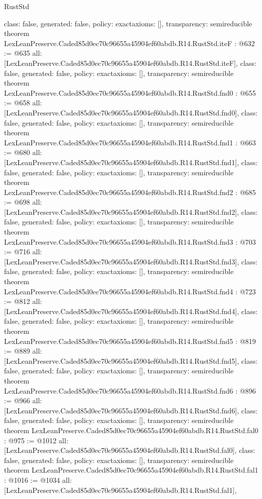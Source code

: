 \begin{lexlean}{RustStd}
\begin{coremodule}
{  class: false,
  generated: false,
  policy: exact{axioms: []},
  transparency: semireducible
}
theorem LexLeanPreserve.Caded85d0ec70c96655a45904ef60abdb.R14.RustStd.iteF : @632 := @635 {
  all: [LexLeanPreserve.Caded85d0ec70c96655a45904ef60abdb.R14.RustStd.iteF],
  class: false,
  generated: false,
  policy: exact{axioms: []},
  transparency: semireducible
}
theorem LexLeanPreserve.Caded85d0ec70c96655a45904ef60abdb.R14.RustStd.fnd0 : @655 := @658 {
  all: [LexLeanPreserve.Caded85d0ec70c96655a45904ef60abdb.R14.RustStd.fnd0],
  class: false,
  generated: false,
  policy: exact{axioms: []},
  transparency: semireducible
}
theorem LexLeanPreserve.Caded85d0ec70c96655a45904ef60abdb.R14.RustStd.fnd1 : @663 := @680 {
  all: [LexLeanPreserve.Caded85d0ec70c96655a45904ef60abdb.R14.RustStd.fnd1],
  class: false,
  generated: false,
  policy: exact{axioms: []},
  transparency: semireducible
}
theorem LexLeanPreserve.Caded85d0ec70c96655a45904ef60abdb.R14.RustStd.fnd2 : @685 := @698 {
  all: [LexLeanPreserve.Caded85d0ec70c96655a45904ef60abdb.R14.RustStd.fnd2],
  class: false,
  generated: false,
  policy: exact{axioms: []},
  transparency: semireducible
}
theorem LexLeanPreserve.Caded85d0ec70c96655a45904ef60abdb.R14.RustStd.fnd3 : @703 := @716 {
  all: [LexLeanPreserve.Caded85d0ec70c96655a45904ef60abdb.R14.RustStd.fnd3],
  class: false,
  generated: false,
  policy: exact{axioms: []},
  transparency: semireducible
}
theorem LexLeanPreserve.Caded85d0ec70c96655a45904ef60abdb.R14.RustStd.fnd4 : @723 := @812 {
  all: [LexLeanPreserve.Caded85d0ec70c96655a45904ef60abdb.R14.RustStd.fnd4],
  class: false,
  generated: false,
  policy: exact{axioms: []},
  transparency: semireducible
}
theorem LexLeanPreserve.Caded85d0ec70c96655a45904ef60abdb.R14.RustStd.fnd5 : @819 := @889 {
  all: [LexLeanPreserve.Caded85d0ec70c96655a45904ef60abdb.R14.RustStd.fnd5],
  class: false,
  generated: false,
  policy: exact{axioms: []},
  transparency: semireducible
}
theorem LexLeanPreserve.Caded85d0ec70c96655a45904ef60abdb.R14.RustStd.fnd6 : @896 := @966 {
  all: [LexLeanPreserve.Caded85d0ec70c96655a45904ef60abdb.R14.RustStd.fnd6],
  class: false,
  generated: false,
  policy: exact{axioms: []},
  transparency: semireducible
}
theorem LexLeanPreserve.Caded85d0ec70c96655a45904ef60abdb.R14.RustStd.fal0 : @975 := @1012 {
  all: [LexLeanPreserve.Caded85d0ec70c96655a45904ef60abdb.R14.RustStd.fal0],
  class: false,
  generated: false,
  policy: exact{axioms: []},
  transparency: semireducible
}
theorem LexLeanPreserve.Caded85d0ec70c96655a45904ef60abdb.R14.RustStd.fal1 : @1016 := @1034 {
  all: [LexLeanPreserve.Caded85d0ec70c96655a45904ef60abdb.R14.RustStd.fal1],
}
\end{coremodule}
\end{lexlean}
